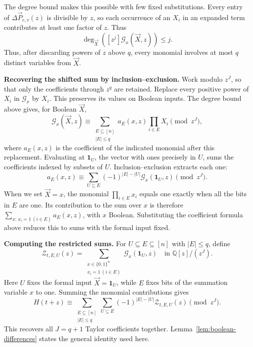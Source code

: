 The degree bound makes this possible with few fixed substitutions.
Every entry of $\Delta\vec P_{e,v}(z)$ is divisible by $z$, so
each occurrence of an $X_i$ in an expanded term contributes at
least one factor of $z$. Thus
\[
 \deg_{\vec X}([z^j]\mathcal G_x(\vec X,z))\le j.
\]
Thus, after discarding powers of $z$ above $q$, every monomial
involves at most $q$ distinct variables from $\vec X$.

\smallskip\noindent
\textbf{Recovering the shifted sum by inclusion--exclusion.}
Work modulo $z^J$, so that only the coefficients through $z^q$
are retained. Replace every positive power of $X_i$ in
$\mathcal G_x$ by $X_i$. This preserves its values on Boolean
inputs. The degree bound above gives, for Boolean $\vec X$,
\[
 \mathcal G_x(\vec X,z)\equiv
 \sum_{\substack{E\subseteq[n]\\|E|\le q}}
       a_E(x,z)\prod_{i\in E}X_i\pmod{z^J},
\]
where $a_E(x,z)$ is the coefficient of the indicated monomial
after this replacement. Evaluating at $\mathbf1_U$, the vector
with ones precisely in $U$, sums the coefficients indexed by
subsets of $U$. Inclusion--exclusion extracts each one:
\[
 a_E(x,z)\equiv
 \sum_{U\subseteq E}(-1)^{|E|-|U|}
                 \mathcal G_x(\mathbf1_U,z)\pmod{z^J}.
\]
When we set $\vec X=x$, the monomial $\prod_{i\in E}x_i$
equals one exactly when all the bits in $E$ are one.
Its contribution to the sum over $x$ is therefore
$\sum_{x:\,x_i=1\ (i\in E)}a_E(x,z)$, with $x$ Boolean.
Substituting the coefficient formula above reduces this to sums
with the formal input fixed.

\smallskip\noindent
\textbf{Computing the restricted sums.}
For $U\subseteq E\subseteq[n]$ with $|E|\le q$, define
\begin{equation}\label{eq:outline-restricted-taylor-sum}
 \mathcal Z_{t,E,U}(z)=
 \sum_{\substack{x\in\{0,1\}^n\\x_i=1\ (i\in E)}}
                    \mathcal G_x(\mathbf1_U,z)
       \quad\text{in }\mathbb Q[z]/(z^J).
\end{equation}
Here $U$ fixes the formal input $\vec X=\mathbf1_U$, while $E$
fixes bits of the summation variable $x$ to one.
Summing the monomial contributions gives
\begin{equation}\label{eq:outline-taylor-recovery}
 H(t+z)\equiv
 \sum_{\substack{E\subseteq[n]\\|E|\le q}}
       \sum_{U\subseteq E}(-1)^{|E|-|U|}
                         \mathcal Z_{t,E,U}(z)\pmod{z^J}.
\end{equation}
This recovers all $J=q+1$ Taylor coefficients together.
Lemma~\ref{lem:boolean-differences} states the general identity
used here.

